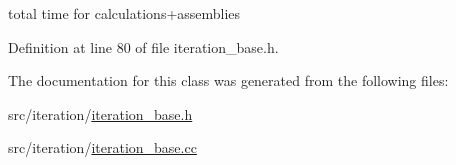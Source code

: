 total time for calculations+assemblies 

Definition at line 80 of file iteration\+\_\+base.\+h.



The documentation for this class was generated from the following files\+:\begin{DoxyCompactItemize}
\item 
src/iteration/\hyperlink{iteration__base_8h}{iteration\+\_\+base.\+h}\item 
src/iteration/\hyperlink{iteration__base_8cc}{iteration\+\_\+base.\+cc}\end{DoxyCompactItemize}
